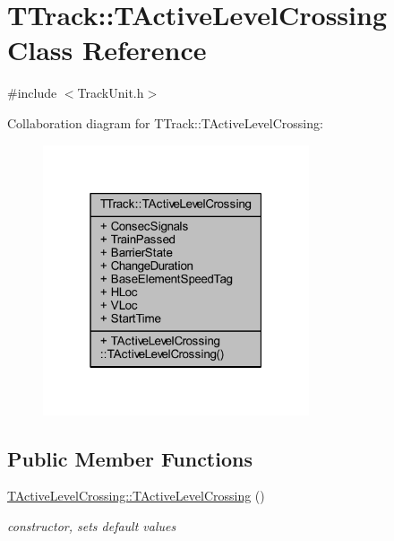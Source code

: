 \hypertarget{class_t_track_1_1_t_active_level_crossing}{}\section{T\+Track\+:\+:T\+Active\+Level\+Crossing Class Reference}
\label{class_t_track_1_1_t_active_level_crossing}


{\ttfamily \#include $<$Track\+Unit.\+h$>$}



Collaboration diagram for T\+Track\+:\+:T\+Active\+Level\+Crossing\+:\nopagebreak
\begin{figure}[H]
\begin{center}
\leavevmode
\includegraphics[width=223pt]{class_t_track_1_1_t_active_level_crossing__coll__graph}
\end{center}
\end{figure}
\subsection*{Public Member Functions}
\begin{DoxyCompactItemize}
\item 
\mbox{\label{class_t_track_1_1_t_active_level_crossing_adc74855a4f0cb115cef8be85b1288f15}} 
\mbox{\hyperlink{class_t_track_1_1_t_active_level_crossing_adc74855a4f0cb115cef8be85b1288f15}{T\+Active\+Level\+Crossing\+::\+T\+Active\+Level\+Crossing}} ()
\begin{DoxyCompactList}\small\item\em constructor, sets default values \end{DoxyCompactList}\end{DoxyCompactItemize}
